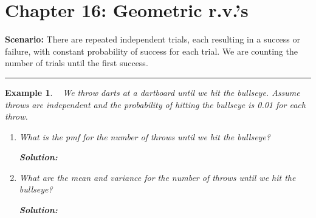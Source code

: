 \documentclass[12pt]{amsart}
\newtheorem{example}[theorem]{Example}
\begin{document}
\setcounter{section}{16}
{\huge  
\section*{Chapter 16: Geometric r.v.'s}
}

{\large 




\vspace{.5cm}

\textbf{Scenario:} There are repeated independent trials, each resulting in a success or failure, with constant probability of success for each trial. We are counting the number of trials until the first success.

\vspace{.5cm}
\hrule
\vspace{.5cm}


\begin{example}\ %
We throw darts at a dartboard until we hit the bullseye. Assume throws are independent and the probability of hitting the bullseye is 0.01 for each throw. 
\begin{enumerate}
\item What is the pmf for the number of throws until we hit the bullseye?

\textbf{Solution:}
\vspace{11cm}

\item What are the mean and variance for the number of throws until we hit the bullseye?

\textbf{Solution:}
\vspace{5cm}




\end{enumerate}
\end{example}}
\end{document}
